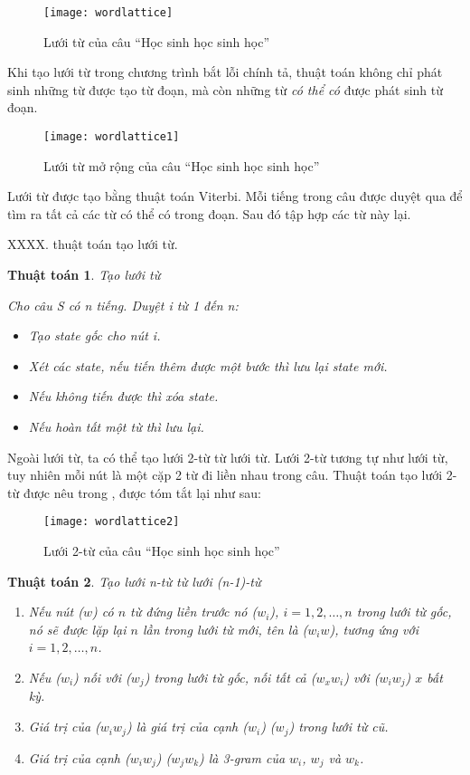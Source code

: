 \documentclass[a4paper]{book} %
\newtheorem{algo}{Thuật toán}
\begin{document}
\begin{figure}[htbp]
  \centering
  \texttt{[image: wordlattice]}
  \caption{Lưới từ của câu ``Học sinh học sinh học''}
  \label{fig:wordlattice}
\end{figure}

Khi tạo lưới từ trong chương trình bắt lỗi chính tả, thuật toán không
chỉ phát sinh những từ được tạo từ đoạn, mà còn những từ {\em có thể
có} được phát sinh từ đoạn.

\begin{figure}[htbp]
  \centering
  \texttt{[image: wordlattice1]}
  \caption{Lưới từ mở rộng của câu ``Học sinh học sinh học''}
  \label{fig:wordlattice1}
\end{figure}

Lưới từ được tạo bằng thuật toán Viterbi. Mỗi tiếng trong câu được
duyệt qua để tìm ra tất cả các từ có thể có trong đoạn. Sau đó tập hợp
các từ này lại. 

XXXX. thuật toán tạo lưới từ.
\begin{algo} Tạo lưới từ

Cho câu S có n tiếng. Duyệt i từ 1 đến n:
\begin{itemize}
\item Tạo state gốc cho nút i.
\item Xét các state, nếu tiến thêm được một bước thì lưu lại state mới.
\item Nếu không tiến được thì xóa state.
\item Nếu hoàn tất một từ thì lưu lại.
\end{itemize}
  
\end{algo}

Ngoài lưới từ, ta có thể tạo lưới 2-từ từ lưới từ. Lưới 2-từ tương tự
như lưới từ, tuy nhiên mỗi nút là một cặp 2 từ đi liền nhau trong câu. Thuật toán
tạo lưới 2-từ được nêu trong \cite{Ravishankar}, được tóm tắt lại như sau:

\begin{figure}[htbp]
  \centering
  \texttt{[image: wordlattice2]}
  \caption{Lưới 2-từ của câu ``Học sinh học sinh học''}
  \label{fig:wordlattice2}
\end{figure}

\begin{algo}Tạo lưới n-từ từ lưới (n-1)-từ

\begin{enumerate}
\item Nếu nút ($w$) có $n$ từ đứng liền trước nó ($w_i$),
  $i=1,2,\ldots,n$ trong lưới từ gốc, nó sẽ được lặp lại $n$ lần trong
  lưới từ mới, tên là ($w_{i}w$), tương ứng với $i=1,2,\ldots,n$.
\item Nếu ($w_i$) nối với ($w_j$) trong lưới từ gốc, nối tất cả
  ($w_xw_i$) với ($w_iw_j$) $x$ bất kỳ.
\item Giá trị của ($w_iw_j$) là giá trị của cạnh ($w_i$) ($w_j$) trong
  lưới từ cũ.
\item Giá trị của cạnh ($w_iw_j$) ($w_jw_k$) là 3-gram của $w_i$, $w_j$
  và $w_k$.
\end{enumerate}
\end{algo}
\end{document}
